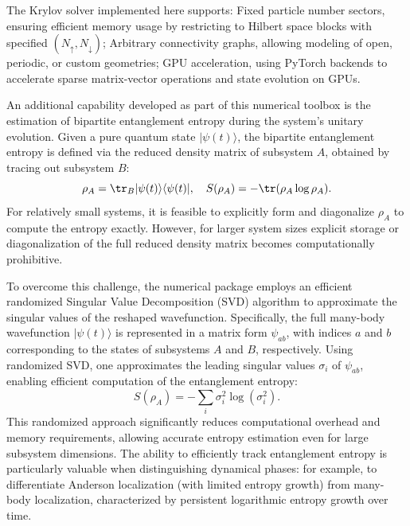 The Krylov solver implemented here supports: {Fixed particle number sectors}, ensuring efficient memory usage by restricting to Hilbert space blocks with specified $(N_\uparrow, N_\downarrow)$; {Arbitrary connectivity graphs}, allowing modeling of open, periodic, or custom geometries; {GPU acceleration}, using PyTorch backends to accelerate sparse matrix-vector operations and state evolution on GPUs.


An additional capability developed as part of this numerical toolbox is the estimation of bipartite entanglement entropy during the system's unitary evolution. Given a pure quantum state $|\psi(t)\rangle$, the bipartite entanglement entropy is defined via the reduced density matrix of subsystem $A$, obtained by tracing out subsystem $B$:
\begin{equation}
\rho_A = \tr_B |\psi(t)\rangle \langle \psi(t)|,\quad
S(\rho_A) = -\tr(\rho_A \log \rho_A).
\end{equation}
For relatively small systems, it is feasible to explicitly form and diagonalize $\rho_A$ to compute the entropy exactly. However, for larger system sizes explicit storage or diagonalization of the full reduced density matrix becomes computationally prohibitive.

To overcome this challenge, the numerical package employs an efficient randomized Singular Value Decomposition (SVD) algorithm \cite{halko_finding_2011} to approximate the singular values of the reshaped wavefunction. Specifically, the full many-body wavefunction $|\psi(t)\rangle$ is represented in a matrix form $\psi_{ab}$, with indices $a$ and $b$ corresponding to the states of subsystems $A$ and $B$, respectively. Using randomized SVD, one approximates the leading singular values ${\sigma_i}$ of $\psi_{ab}$, enabling efficient computation of the entanglement entropy:
\begin{equation}
S(\rho_A) = -\sum_i \sigma_i^2 \log(\sigma_i^2).
\end{equation}
This randomized approach significantly reduces computational overhead and memory requirements, allowing accurate entropy estimation even for large subsystem dimensions. The ability to efficiently track entanglement entropy is particularly valuable when distinguishing dynamical phases: for example, to differentiate Anderson localization (with limited entropy growth) from many-body localization, characterized by persistent logarithmic entropy growth over time.



